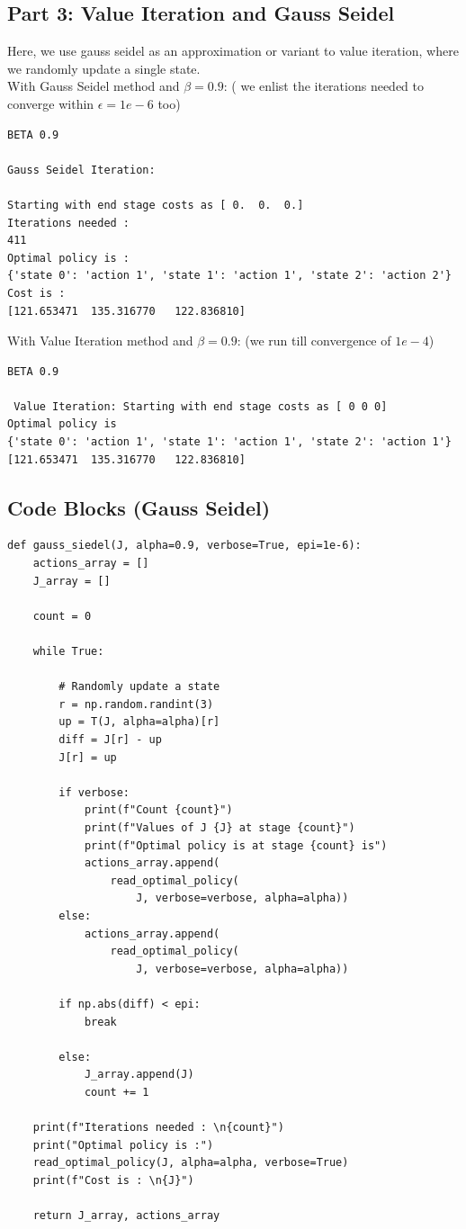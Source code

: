 \subsection{Part 3: Value Iteration and Gauss Seidel}

Here, we use gauss seidel as an approximation or variant to value iteration, where we randomly update a single state. \\

With Gauss Seidel method and $\beta = 0.9$: ( we enlist the iterations needed to converge within $\epsilon = 1e-6$ too)

\begin{lstlisting}
BETA 0.9

Gauss Seidel Iteration: 

Starting with end stage costs as [ 0.  0.  0.]
Iterations needed : 
411
Optimal policy is :
{'state 0': 'action 1', 'state 1': 'action 1', 'state 2': 'action 2'}
Cost is : 
[121.653471  135.316770   122.836810]
\end{lstlisting}

With Value Iteration method and $\beta = 0.9$: (we run till convergence of $1e-4$)

\begin{lstlisting}
BETA 0.9

 Value Iteration: Starting with end stage costs as [ 0 0 0]
Optimal policy is 
{'state 0': 'action 1', 'state 1': 'action 1', 'state 2': 'action 1'}
[121.653471  135.316770   122.836810]
\end{lstlisting}

\subsection {Code Blocks (Gauss Seidel)}
\begin{lstlisting}
def gauss_siedel(J, alpha=0.9, verbose=True, epi=1e-6):
    actions_array = []
    J_array = []

    count = 0

    while True:

        # Randomly update a state
        r = np.random.randint(3)
        up = T(J, alpha=alpha)[r]
        diff = J[r] - up
        J[r] = up

        if verbose:
            print(f"Count {count}")
            print(f"Values of J {J} at stage {count}")
            print(f"Optimal policy is at stage {count} is")
            actions_array.append(
                read_optimal_policy(
                    J, verbose=verbose, alpha=alpha))
        else:
            actions_array.append(
                read_optimal_policy(
                    J, verbose=verbose, alpha=alpha))

        if np.abs(diff) < epi:
            break

        else:
            J_array.append(J)
            count += 1

    print(f"Iterations needed : \n{count}")
    print("Optimal policy is :")
    read_optimal_policy(J, alpha=alpha, verbose=True)
    print(f"Cost is : \n{J}")

    return J_array, actions_array
\end{lstlisting}
\bigskip

